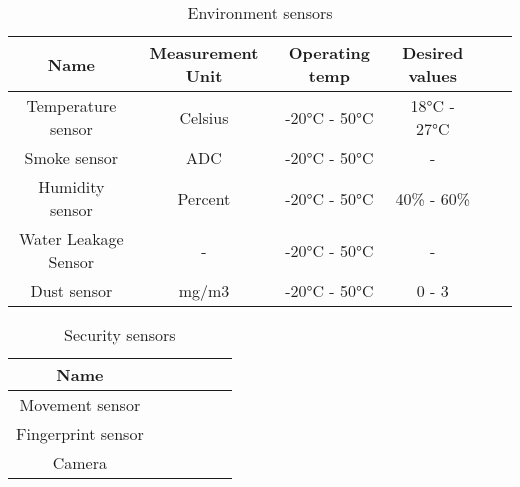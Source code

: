             \begin{table}
                \centering
                \caption{Environment sensors}
                \begin{tabular}{ |c|c|c|c|c|c|}
                    \hline
                    {\textbf{Name}} & {\textbf{Measurement Unit}} & {\textbf{Operating temp}}& {\textbf{Desired values}}   \\ 
                    \hline

                    Temperature sensor & Celsius & -20°C - 50°C & 18°C - 27°C\\
                    \hline
                    Smoke sensor & ADC & -20°C - 50°C & -  \\
                    \hline
                    Humidity sensor & Percent &  -20°C - 50°C & 40\% - 60\% \\
                    \hline
                    Water Leakage Sensor & - & -20°C - 50°C & -  \\
                    \hline
                    Dust sensor &  mg/m3 & -20°C - 50°C & 0 - 3  \\
                    \hline
                \end{tabular}
                \label {table:envirement_sen}
            \end{table}
        
            \begin{table}
                \centering
                \caption{Security sensors}
                \begin{tabular}{ |c|c|c|c|c|c|}
                    \hline
                    {\textbf{Name}}  \\ 
                    \hline

                    Movement sensor  \\
                    \hline
                    Fingerprint sensor  \\
                    \hline
                    Camera \\
                    \hline
                \end{tabular}
                \label{table:security_sen}
            \end{table}
          


